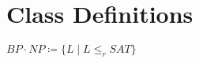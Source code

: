 \section{Class Definitions}
\begin{definition}[$BP\cdot NP$]
$BP\cdot NP\coloneqq \{ L\mid L\leq_r SAT \}$
\end{definition}
\begin{definition}[$NP/poly$]

\end{definition}
\begin{definition}[$AM$]

\end{definition}
\begin{definition}[$\#P$]

\end{definition}